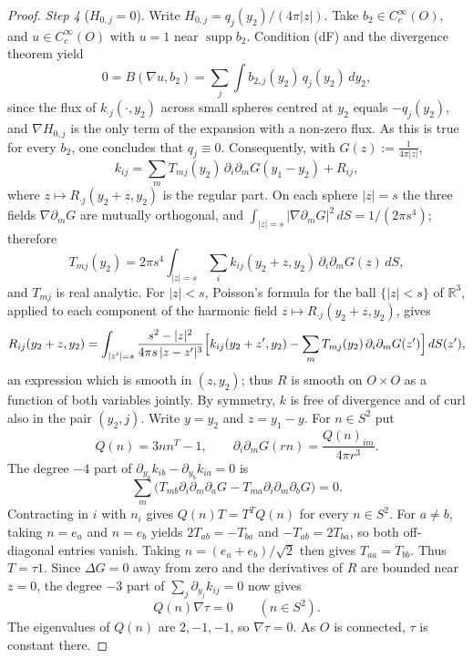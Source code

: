 \documentclass[11pt]{amsart}
\theoremstyle{definition}
\begin{document}
\begin{proof}
\emph{Step 4} ($H_{0,j}=0$).
Write $H_{0,j}=q_j(y_2)/(4\pi|z|)$.
Take $b_2\in C_c^\infty(O)$, and $u\in C_c^\infty(O)$ with $u=1$ near $\operatorname{supp}b_2$.
Condition (dF) and the divergence theorem yield
\begin{equation*}
0=B(\nabla u,b_2)=\sum_j\int b_{2,j}(y_2)\,q_j(y_2)\,dy_2,
\end{equation*}
since the flux of $k_{\cdot j}(\cdot,y_2)$ across small spheres centred at $y_2$ equals $-q_j(y_2)$, and $\nabla H_{0,j}$ is the only term of the expansion with a non-zero flux.
As this is true for every $b_2$, one concludes that $q_j\equiv0$.
Consequently, with $G(z):=\frac1{4\pi|z|}$,
\begin{equation*}
k_{ij}=\sum_mT_{mj}(y_2)\,\partial_i\partial_mG(y_1-y_2)+R_{ij},
\end{equation*}
where $z\mapsto R_{\cdot j}(y_2+z,y_2)$ is the regular part.
On each sphere $|z|=s$ the three fields $\nabla\partial_mG$ are mutually orthogonal, and $\int_{|z|=s}|\nabla\partial_mG|^2\,dS=1/(2\pi s^4)$; therefore
\begin{equation*}
T_{mj}(y_2)=2\pi s^4\int_{|z|=s}\sum_ik_{ij}(y_2+z,y_2)\,\partial_i\partial_mG(z)\,dS,
\end{equation*}
and $T_{mj}$ is real analytic.
For $|z|<s$, Poisson's formula for the ball $\{|z|<s\}$ of $\mathbb R^3$, applied to each component of the harmonic field $z\mapsto R_{\cdot j}(y_2+z,y_2)$, gives
\begin{equation*}
R_{ij}(y_2+z,y_2)=\int_{|z'|=s}\frac{s^2-|z|^2}{4\pi s\,|z-z'|^3}\Bigl[k_{ij}(y_2+z',y_2)-\sum_mT_{mj}(y_2)\,\partial_i\partial_mG(z')\Bigr]\,dS(z'),
\end{equation*}
an expression which is smooth in $(z,y_2)$; thus $R$ is smooth on $O\times O$ as a function of both variables jointly.
By symmetry, $k$ is free of divergence and of curl also in the pair $(y_2,j)$.
Write $y=y_2$ and $z=y_1-y$. For $n\in S^2$ put
\[
Q(n)=3nn^T-1,\qquad
\partial_i\partial_mG(rn)=\frac{Q(n)_{im}}{4\pi r^3}.
\]
The degree $-4$ part of
$\partial_{y_a}k_{ib}-\partial_{y_b}k_{ia}=0$ is
\[
\sum_m\bigl(T_{mb}\partial_i\partial_m\partial_aG
             -T_{ma}\partial_i\partial_m\partial_bG\bigr)=0.
\]
Contracting in $i$ with $n_i$ gives
$Q(n)T=T^TQ(n)$ for every $n\in S^2$.
For $a\ne b$, taking $n=e_a$ and $n=e_b$ yields
$2T_{ab}=-T_{ba}$ and $-T_{ab}=2T_{ba}$, so both off-diagonal entries vanish.
Taking $n=(e_a+e_b)/\sqrt2$ then gives $T_{aa}=T_{bb}$.
Thus $T=\tau1$.
Since $\Delta G=0$ away from zero and the derivatives of $R$ are bounded near $z=0$, the degree $-3$ part of
$\sum_j\partial_{y_j}k_{ij}=0$ now gives
\[
Q(n)\nabla\tau=0\qquad(n\in S^2).
\]
The eigenvalues of $Q(n)$ are $2,-1,-1$, so $\nabla\tau=0$.
As $O$ is connected, $\tau$ is constant there.


\end{proof}
\end{document}
